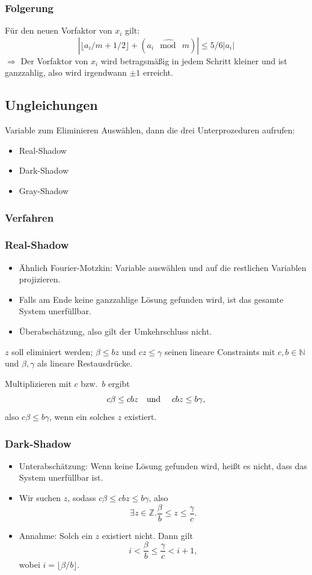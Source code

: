 \documentclass[hyperref={pdfpagelabels=false}]{beamer}
\newcommand{\IN}{\mathds{N}}
\newcommand{\IZ}{\mathds{Z}}
\newcommand{\hmod}{\ \widehat\bmod\ }
\begin{document}
\begin{frame}
	\frametitle{Folgerung}
	Für den neuen Vorfaktor von $x_i$ gilt:
	\[ | \lfloor a_i/m + 1/2 \rfloor + (a_i \hmod m) | \leq 5/6 | a_i | \]
	$\Rightarrow$ Der Vorfaktor von $x_i$ wird betragsmäßig in jedem Schritt kleiner und ist ganzzahlig, also wird irgendwann $\pm 1$ erreicht.
\end{frame}
\subsection{Ungleichungen}
\begin{frame}
	Variable zum Eliminieren Auswählen, dann die drei Unterprozeduren aufrufen:
	\begin{itemize}
		\item Real-Shadow
		\item Dark-Shadow
		\item Gray-Shadow
	\end{itemize}
\end{frame}
\begin{frame}
	\frametitle{Verfahren}
	\begin{center}
	\end{center}
\end{frame}
\begin{frame}
	\frametitle{Real-Shadow}
	\begin{itemize}
		\item Ähnlich Fourier-Motzkin: Variable auswählen und auf die restlichen Variablen projizieren.
		\item Falls am Ende keine ganzzahlige Lösung gefunden wird, ist das gesamte System unerfüllbar.
		\item Überabschätzung, also gilt der Umkehrschluss nicht.
	\end{itemize}
	$z$ soll eliminiert werden; $\beta \leq bz$ und $cz \leq \gamma$ seinen lineare Constraints mit $c,b \in \IN$ und $\beta,\gamma$ als lineare Restausdrücke.

	Multiplizieren mit $c$ bzw.\ $b$ ergibt
	\[ c\beta \leq cbz \text{\quad und \quad} cbz \leq b\gamma, \]
	also $c\beta \leq b\gamma$, wenn ein solches $z$ existiert.
\end{frame}
\begin{frame}
	\frametitle{Dark-Shadow}
	\begin{itemize}
		\item Unterabschätzung: Wenn keine Lösung gefunden wird, heißt es nicht, dass das System unerfüllbar ist.
		\item Wir suchen $z$, sodass $c \beta \leq cbz \leq b \gamma$, also
			\[ \exists z \in \IZ. \frac{\beta}{b} \leq z \leq \frac{\gamma}{c}. \]
		\item Annahme: Solch ein $z$ existiert nicht. Dann gilt
			\[ i < \frac{\beta}{b} \leq \frac{\gamma}{c} < i+1, \]
			wobei $i = \lfloor \beta/b \rfloor$.
	\end{itemize}
\end{frame}
\end{document}
